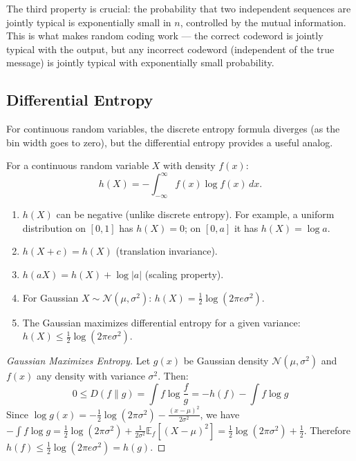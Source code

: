 The third property is crucial: the probability that two independent sequences are jointly typical is exponentially small in $n$, controlled by the mutual information. This is what makes random coding work — the correct codeword is jointly typical with the output, but any incorrect codeword (independent of the true message) is jointly typical with exponentially small probability.

\subsection{Differential Entropy}
\label{sec:information:differential}

For continuous random variables, the discrete entropy formula diverges (as the bin width goes to zero), but the differential entropy provides a useful analog.

\begin{definition}
For a continuous random variable $X$ with density $f(x)$:
\[
h(X) = -\int_{-\infty}^{\infty} f(x) \log f(x) \, dx.
\]
\end{definition}

\begin{theorem}
\begin{enumerate}
\item $h(X)$ can be negative (unlike discrete entropy). For example, a uniform distribution on $[0,1]$ has $h(X)=0$; on $[0,a]$ it has $h(X)=\log a$.
\item $h(X+c) = h(X)$ (translation invariance).
\item $h(aX) = h(X) + \log|a|$ (scaling property).
\item For Gaussian $X \sim \mathcal{N}(\mu,\sigma^2)$: $h(X) = \frac{1}{2}\log(2\pi e \sigma^2)$.
\item The Gaussian maximizes differential entropy for a given variance: $h(X) \le \frac{1}{2}\log(2\pi e \sigma^2)$.
\end{enumerate}
\end{theorem}

\begin{proof}[Gaussian Maximizes Entropy]
Let $g(x)$ be Gaussian density $\mathcal{N}(\mu,\sigma^2)$ and $f(x)$ any density with variance $\sigma^2$. Then:
\[
0 \le D(f\|g) = \int f \log \frac{f}{g} = -h(f) - \int f \log g
\]
Since $\log g(x) = -\frac{1}{2}\log(2\pi\sigma^2) - \frac{(x-\mu)^2}{2\sigma^2}$, we have $-\int f\log g = \frac{1}{2}\log(2\pi\sigma^2) + \frac{1}{2\sigma^2}\mathbb{E}_f[(X-\mu)^2] = \frac{1}{2}\log(2\pi\sigma^2) + \frac{1}{2}$. Therefore $h(f) \le \frac{1}{2}\log(2\pi e\sigma^2) = h(g)$.
\end{proof}

